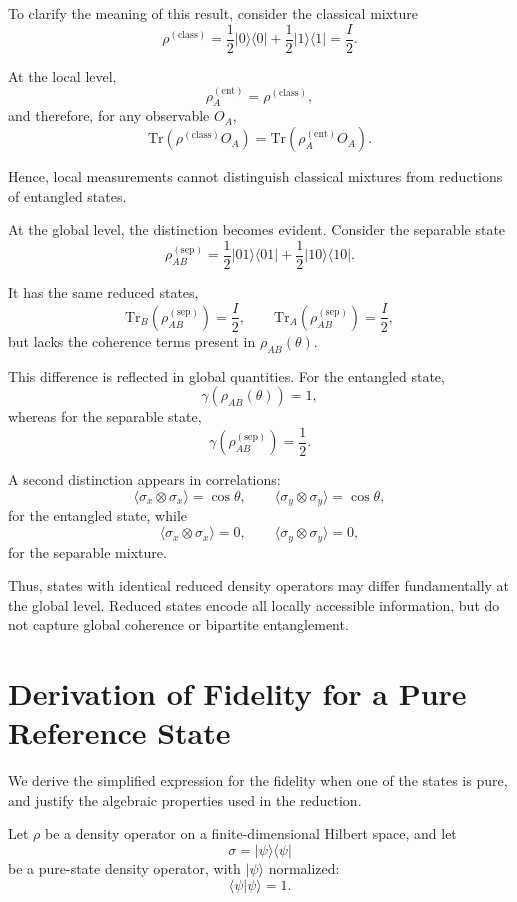 \documentclass[a4paper]{article}
\begin{document}
To clarify the meaning of this result, consider the classical mixture
\[
\rho^{(\mathrm{class})}
=
\frac{1}{2}|0\rangle\langle 0|
+
\frac{1}{2}|1\rangle\langle 1|
=
\frac{I}{2}.
\]

At the local level,
\[
\rho_A^{(\mathrm{ent})} = \rho^{(\mathrm{class})},
\]
and therefore, for any observable \(O_A\),
\[
\mathrm{Tr}(\rho^{(\mathrm{class})} O_A)
=
\mathrm{Tr}(\rho_A^{(\mathrm{ent})} O_A).
\]

Hence, local measurements cannot distinguish classical mixtures from reductions of entangled states.

At the global level, the distinction becomes evident. Consider the separable state
\[
\rho_{AB}^{(\mathrm{sep})}
=
\frac{1}{2}|01\rangle\langle 01|
+
\frac{1}{2}|10\rangle\langle 10|.
\]

It has the same reduced states,
\[
\mathrm{Tr}_B(\rho_{AB}^{(\mathrm{sep})}) = \frac{I}{2},
\qquad
\mathrm{Tr}_A(\rho_{AB}^{(\mathrm{sep})}) = \frac{I}{2},
\]
but lacks the coherence terms present in \( \rho_{AB}(\theta) \).

This difference is reflected in global quantities. For the entangled state,
\[
\gamma(\rho_{AB}(\theta)) = 1,
\]
whereas for the separable state,
\[
\gamma(\rho_{AB}^{(\mathrm{sep})}) = \frac{1}{2}.
\]

A second distinction appears in correlations:
\[
\langle \sigma_x \otimes \sigma_x \rangle = \cos\theta, \qquad
\langle \sigma_y \otimes \sigma_y \rangle = \cos\theta,
\]
for the entangled state, while
\[
\langle \sigma_x \otimes \sigma_x \rangle = 0, \qquad
\langle \sigma_y \otimes \sigma_y \rangle = 0,
\]
for the separable mixture.

Thus, states with identical reduced density operators may differ fundamentally at the global level. Reduced states encode all locally accessible information, but do not capture global coherence or bipartite entanglement.
\section{Derivation of Fidelity for a Pure Reference State}

We derive the simplified expression for the fidelity when one of the states is pure, and justify the algebraic properties used in the reduction.

\medskip

Let $\rho$ be a density operator on a finite-dimensional Hilbert space, and let
\[
\sigma = |\psi\rangle\langle\psi|
\]
be a pure-state density operator, with $|\psi\rangle$ normalized:
\[
\langle \psi | \psi \rangle = 1.
\]
\end{document}
